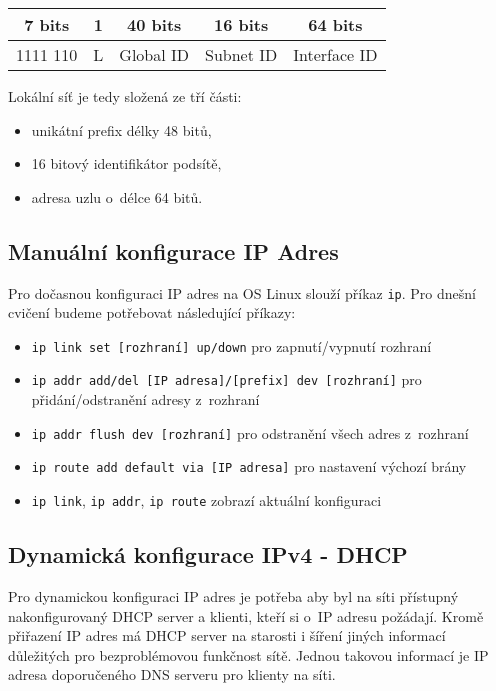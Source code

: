 \begin{table}[ht!]
    \begin{center}
        \begin{tabular}{c|c|c|c|c}
            7 bits & 1 &  40 bits  &  16 bits  & 64 bits \\
            \hline
            1111 110 & L & Global ID & Subnet ID & Interface ID \\
            \hline
        \end{tabular}
    \end{center}
\end{table}

Lokální síť je tedy složená ze tří části:
\begin{itemize}
    \item unikátní prefix délky 48 bitů,
    \item 16 bitový identifikátor podsítě,
    \item adresa uzlu o~délce 64 bitů.
\end{itemize}

\subsection{Manuální konfigurace IP Adres}\label{ip-manual}
Pro dočasnou konfiguraci IP adres na OS Linux slouží příkaz {\tt ip}. Pro
dnešní cvičení budeme potřebovat následující příkazy:
\begin{itemize}
    \item \verb_ip link set [rozhraní] up/down_ pro zapnutí/vypnutí rozhraní
    \item \verb_ip addr add/del [IP adresa]/[prefix] dev [rozhraní]_ pro
        přidání/odstranění adresy z~rozhraní
    \item \verb_ip addr flush dev [rozhraní]_ pro odstranění všech adres
z~rozhraní
    \item \verb_ip route add default via [IP adresa]_ pro nastavení výchozí
        brány
    \item \verb_ip link_, \verb_ip addr_, \verb_ip route_ zobrazí aktuální
        konfiguraci
\end{itemize}

\subsection{Dynamická konfigurace IPv4 - DHCP}\label{dhcp}
Pro dynamickou konfiguraci IP adres je potřeba aby byl na síti přístupný
nakonfigurovaný DHCP server a klienti, kteří si o~IP adresu požádají. Kromě
přiřazení IP adres má DHCP server na starosti i šíření jiných informací
důležitých pro bezproblémovou funkčnost sítě. Jednou takovou informací je IP
adresa doporučeného DNS serveru pro klienty na síti.

